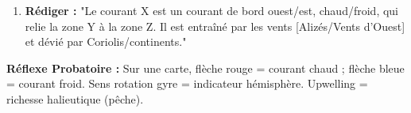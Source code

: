 \documentclass[11pt]{article}
\begin{document}
\begin{methode}
\begin{enumerate}
\begin{itemize}
                  \item \textbf{Sites de formation d'eau profonde (NADW, AABW) :} Mer du Labrador, Mer du Groenland, Mer de Weddell (Antarctique). Refroidissement intense + augmentation salinité (formation glace de mer $\rightarrow$ sel rejeté) $\rightarrow$ eau très dense $\rightarrow$ \textbf{plongée (convection profonde)}.
                  \item \textbf{Parcours :} Eau profonde $\rightarrow$ circulation lente au fond (siècles) $\rightarrow$ \textbf{remontée (upwelling)} principalement dans l'Océan Austral et Pacifique Nord $\rightarrow$ retour en surface vers Atlantique Nord.
              \end{itemize}
        \item \textbf{Rédiger :} "Le courant X est un courant de bord ouest/est, chaud/froid, qui relie la zone Y à la zone Z. Il est entraîné par les vents [Alizés/Vents d'Ouest] et dévié par Coriolis/continents."
    \end{enumerate}
    \textbf{Réflexe Probatoire :} Sur une carte, flèche rouge = courant chaud ; flèche bleue = courant froid. Sens rotation gyre = indicateur hémisphère. Upwelling = richesse halieutique (pêche).
\end{methode}
\end{document}
